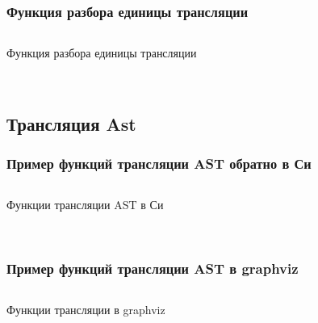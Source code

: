 \subsubsection{Функция разбора единицы трансляции}
\begin{code}
  \inputminted[breaklines=true, xleftmargin=1em, linenos, frame=single,
  framesep=10pt, fontsize=\footnotesize]
  {c}{listings/parsing/tr_unit.c}
  \caption{Функция разбора единицы трансляции}
  \label{extras:parse_tr_unit}
\end{code}\


\subsection{Трансляция Ast}
\subsubsection{Пример функций трансляции AST обратно в Си}
\begin{code}
  \inputminted[breaklines=true, xleftmargin=1em, linenos, frame=single,
  framesep=10pt, fontsize=\footnotesize]
  {c}{listings/translation/unparse/unparse.c}
  \caption{Функции трансляции AST в Си}
  \label{extras:unparse}
\end{code}\

\subsubsection{Пример функций трансляции AST в graphviz}
\begin{code}
  \inputminted[breaklines=true, xleftmargin=1em, linenos, frame=single,
  framesep=10pt, fontsize=\footnotesize]
  {c}{listings/translation/ast_vis/graphviz.c}
  \caption{Функции трансляции в graphviz}
  \label{extras:compile-graphviz}
\end{code}\